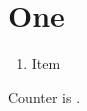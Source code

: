 \documentclass{article}
\newcounter{mycnt}
\begin{document}
\section{One}\label{k:d}
\begin{enumerate}
\renewcommand{\labelenumi}{\alph{enumi})}
\renewcommand{\theenumi}{\alph{enumi}}
\item Item\label{k:d}
\end{enumerate}
Counter is \themycnt.
\end{document}
